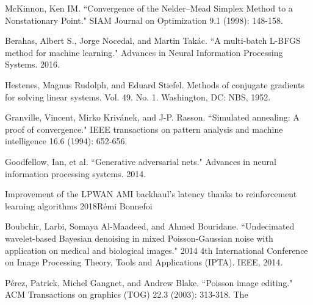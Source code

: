 \documentclass[10pt,letterpaper]{article}
\begin{document}
\begin{thebibliography}{10}
McKinnon, Ken IM. “Convergence of the Nelder--Mead Simplex Method to a Nonstationary Point." SIAM Journal on Optimization 9.1 (1998): 148-158.

Berahas, Albert S., Jorge Nocedal, and Martin Takác. “A multi-batch L-BFGS method for machine learning." Advances in Neural Information Processing Systems. 2016.

Hestenes, Magnus Rudolph, and Eduard Stiefel. Methods of conjugate gradients for solving linear systems. Vol. 49. No. 1. Washington, DC: NBS, 1952.

Granville, Vincent, Mirko Krivánek, and J-P. Rasson. “Simulated annealing: A proof of convergence." IEEE transactions on pattern analysis and machine intelligence 16.6 (1994): 652-656.

Goodfellow, Ian, et al. “Generative adversarial nets." Advances in neural information processing systems. 2014.

Improvement of the LPWAN AMI backhaul’s latency thanks to reinforcement learning algorithms 2018Rémi Bonnefoi

Boubchir, Larbi, Somaya Al-Maadeed, and Ahmed Bouridane. “Undecimated wavelet-based Bayesian denoising in mixed Poisson-Gaussian noise with application on medical and biological images." 2014 4th International Conference on Image Processing Theory, Tools and Applications (IPTA). IEEE, 2014.

Pérez, Patrick, Michel Gangnet, and Andrew Blake. “Poisson image editing." ACM Transactions on graphics (TOG) 22.3 (2003): 313-318. The 


\end{thebibliography}
\end{document}
